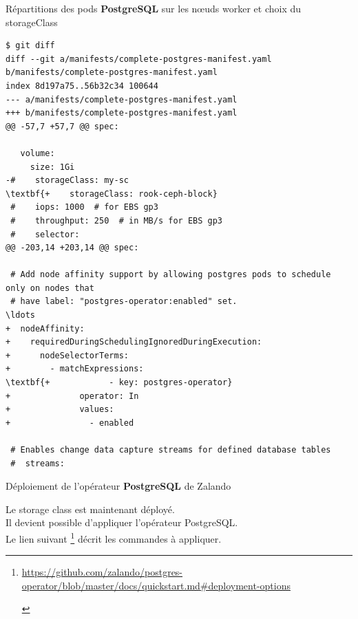 \begin{frame}[shrink=5,fragile]{Répartitions des pods \textbf{PostgreSQL} sur les n{\oe}uds worker et choix du storageClass}

\begin{tiny}
\begin{Verbatim}[commandchars=\\\{\}]
$ git diff
diff --git a/manifests/complete-postgres-manifest.yaml b/manifests/complete-postgres-manifest.yaml
index 8d197a75..56b32c34 100644
--- a/manifests/complete-postgres-manifest.yaml
+++ b/manifests/complete-postgres-manifest.yaml
@@ -57,7 +57,7 @@ spec:
 
   volume:
     size: 1Gi
-#    storageClass: my-sc
\textbf{+    storageClass: rook-ceph-block}
 #    iops: 1000  # for EBS gp3
 #    throughput: 250  # in MB/s for EBS gp3
 #    selector:
@@ -203,14 +203,14 @@ spec:
 
 # Add node affinity support by allowing postgres pods to schedule only on nodes that
 # have label: "postgres-operator:enabled" set.
\ldots
+  nodeAffinity:
+    requiredDuringSchedulingIgnoredDuringExecution:
+      nodeSelectorTerms:
+        - matchExpressions:
\textbf{+            - key: postgres-operator}
+              operator: In
+              values:
+                - enabled
 
 # Enables change data capture streams for defined database tables
 #  streams:
\end{Verbatim}
\end{tiny}

\end{frame}


\begin{frame}[fragile]{Déploiement de l'opérateur \textbf{PostgreSQL} de Zalando}

Le storage class est maintenant déployé.\\
Il devient possible d'appliquer l'opérateur PostgreSQL.\\
   Le lien suivant \footnote{
\begin{tcolorbox}
\tiny{\url{https://github.com/zalando/postgres-operator/blob/master/docs/quickstart.md\#deployment-options}}
\end{tcolorbox}
   } décrit les commandes à appliquer.

\end{frame}


